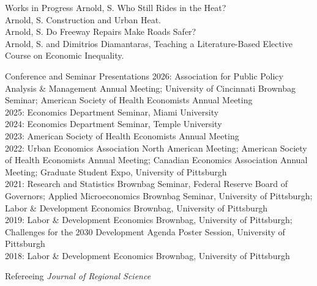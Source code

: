 \documentclass{resume} %
\begin{document}
\begin{rSection}{Works in Progress}
	Arnold, S. Who Still Rides in the Heat?\\
	Arnold, S. Construction and Urban Heat.\\
	Arnold, S. Do Freeway Repairs Make Roads Safer?\\
	Arnold, S. and Dimitrios Diamantaras, Teaching a Literature-Based Elective Course on Economic Inequality.
\end{rSection}


\begin{rSection}{Conference and Seminar Presentations}
	2026: Association for Public Policy Analysis \& Management Annual Meeting; University of Cincinnati Brownbag Seminar; American Society of Health Economists Annual Meeting\\
	2025: Economics Department Seminar, Miami University\\
	2024: Economics Department Seminar, Temple University \\
	2023: American Society of Health Economists Annual Meeting\\
	2022: Urban Economics Association North American Meeting; American Society of Health Economists Annual Meeting; Canadian Economics Association Annual Meeting; Graduate Student Expo, University of Pittsburgh \\
	2021: Research and Statistics Brownbag Seminar, Federal Reserve Board of Governors; Applied Microeconomics Brownbag Seminar, University of Pittsburgh; Labor \& Development Economics Brownbag, University of Pittsburgh\\
	2019: Labor \& Development Economics Brownbag, University of Pittsburgh; Challenges for the 2030 Development Agenda Poster Session, University of Pittsburgh \\
	2018: Labor \& Development Economics Brownbag, University of Pittsburgh 
\end{rSection}


\begin{rSection}{Refereeing}
	\textit{Journal of Regional Science}
\end{rSection}
\end{document}
